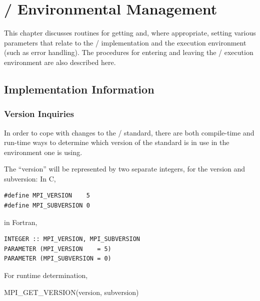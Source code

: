 \chapter{\texorpdfstring{\MPI/}{MPI} Environmental Management}
\label{sec:environment}
\label{chap:environment}

This chapter discusses routines for getting and, where appropriate, setting
various parameters that relate to the \MPI/ implementation and the execution environment
(such as error handling).
The procedures for entering and leaving the \MPI/ execution environment are also
described here.

\section{Implementation Information}
\label{sec:inquiry-impl}

\subsection{Version Inquiries}
\label{subsec:inquiry-version}
In order to cope with changes to the \MPI/ standard, there are both compile-time
and run-time ways to determine which version of the standard is in use in the
environment one is using.

The ``version'' will be represented by two separate integers, for the version
and subversion: In C,
\begin{lstlisting}[language={[MPI]C}]
#define MPI_VERSION    5
#define MPI_SUBVERSION 0
\end{lstlisting}
in Fortran,
\begin{lstlisting}[language={[MPI]Fortran}]
INTEGER :: MPI_VERSION, MPI_SUBVERSION
PARAMETER (MPI_VERSION    = 5)
PARAMETER (MPI_SUBVERSION = 0)
\end{lstlisting}
\noindent

For runtime determination,

\begin{funcdef}{MPI\_GET\_VERSION}{(\mbox{version}, \mbox{subversion})}
\end{funcdef}


